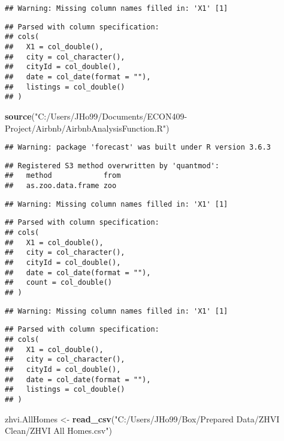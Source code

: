 \documentclass[
]{article}
\newenvironment{Shaded}{\begin{snugshade}}{\end{snugshade}}
\newcommand{\KeywordTok}[1]{\textcolor[rgb]{0.13,0.29,0.53}{\textbf{#1}}}
\newcommand{\NormalTok}[1]{#1}
\newcommand{\StringTok}[1]{\textcolor[rgb]{0.31,0.60,0.02}{#1}}
\begin{document}
\begin{verbatim}
## Warning: Missing column names filled in: 'X1' [1]
\end{verbatim}

\begin{verbatim}
## Parsed with column specification:
## cols(
##   X1 = col_double(),
##   city = col_character(),
##   cityId = col_double(),
##   date = col_date(format = ""),
##   listings = col_double()
## )
\end{verbatim}

\begin{Shaded}
\begin{Highlighting}[]
\KeywordTok{source}\NormalTok{(}\StringTok{"C:/Users/JHo99/Documents/ECON409-Project/Airbnb/AirbnbAnalysisFunction.R"}\NormalTok{)}
\end{Highlighting}
\end{Shaded}

\begin{verbatim}
## Warning: package 'forecast' was built under R version 3.6.3
\end{verbatim}

\begin{verbatim}
## Registered S3 method overwritten by 'quantmod':
##   method            from
##   as.zoo.data.frame zoo
\end{verbatim}

\begin{verbatim}
## Warning: Missing column names filled in: 'X1' [1]
\end{verbatim}

\begin{verbatim}
## Parsed with column specification:
## cols(
##   X1 = col_double(),
##   city = col_character(),
##   cityId = col_double(),
##   date = col_date(format = ""),
##   count = col_double()
## )
\end{verbatim}

\begin{verbatim}
## Warning: Missing column names filled in: 'X1' [1]
\end{verbatim}

\begin{verbatim}
## Parsed with column specification:
## cols(
##   X1 = col_double(),
##   city = col_character(),
##   cityId = col_double(),
##   date = col_date(format = ""),
##   listings = col_double()
## )
\end{verbatim}

\begin{Shaded}
\begin{Highlighting}[]
\NormalTok{zhvi.AllHomes <-}\StringTok{ }\KeywordTok{read_csv}\NormalTok{(}\StringTok{"C:/Users/JHo99/Box/Prepared Data/ZHVI Clean/ZHVI All Homes.csv"}\NormalTok{)}
\end{Highlighting}
\end{Shaded}
\end{document}
